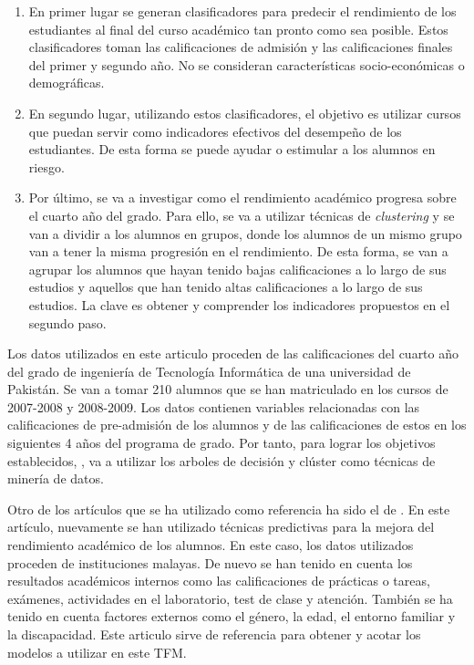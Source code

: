 \begin{enumerate}
\item En primer lugar se generan clasificadores para predecir el rendimiento de los estudiantes al final del curso académico tan pronto como sea posible. Estos clasificadores toman las calificaciones de admisión y las calificaciones finales del primer y segundo año. No se consideran características socio-económicas o demográficas.
\item En segundo lugar, utilizando estos clasificadores, el objetivo es utilizar cursos que puedan servir como indicadores efectivos del desempeño de los estudiantes. De esta forma se puede ayudar o estimular a los alumnos en riesgo.
\item Por último, se va a investigar como el rendimiento académico progresa sobre el cuarto año del grado. Para ello, se va a utilizar técnicas de \textit{clustering} y se van a dividir a los alumnos en grupos, donde los alumnos de un mismo grupo van a tener la misma progresión en el rendimiento. De esta forma, se van a agrupar los alumnos que hayan tenido bajas calificaciones a lo largo de sus estudios y aquellos que han tenido altas calificaciones a lo largo de sus estudios. La clave es obtener y comprender los indicadores propuestos en el segundo paso.
\end{enumerate}

Los datos utilizados en este articulo proceden de las calificaciones del cuarto año del grado de ingeniería de Tecnología Informática de una universidad de Pakistán. Se van a tomar 210 alumnos que se han matriculado en los cursos de 2007-2008 y 2008-2009. Los datos contienen variables relacionadas con las calificaciones de pre-admisión de los alumnos y de las calificaciones de estos en los siguientes 4 años del programa de grado.
Por tanto, para lograr los objetivos establecidos, , va a utilizar los arboles de decisión y clúster como técnicas de minería de datos.

Otro de los artículos que se ha utilizado como referencia ha sido el de . En este artículo, nuevamente se han utilizado técnicas predictivas para la mejora del rendimiento académico de los alumnos. En este caso, los datos utilizados proceden de instituciones malayas. De nuevo se han tenido en cuenta los resultados académicos internos como las calificaciones de prácticas o tareas, exámenes, actividades en el laboratorio, test de clase y atención. También se ha tenido en cuenta factores externos como el género, la edad, el entorno familiar y la discapacidad. Este articulo sirve de referencia para obtener y acotar los modelos a utilizar en este TFM.

